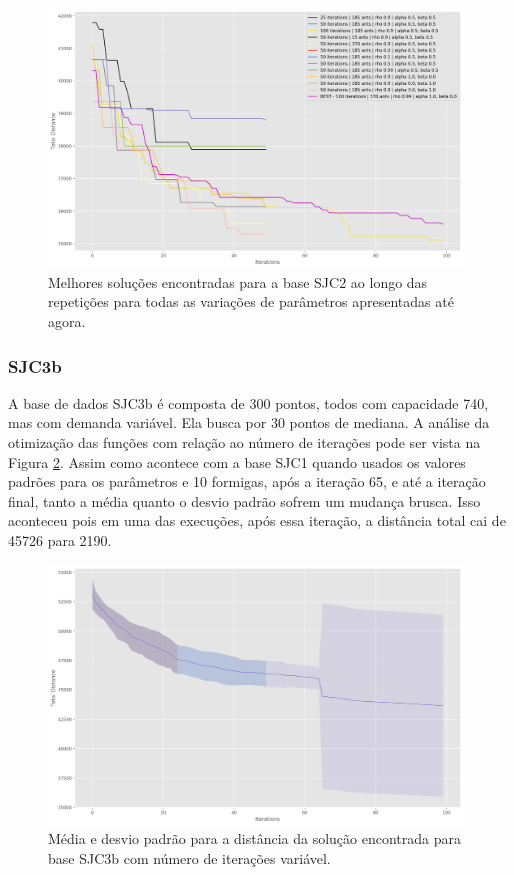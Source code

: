 \begin{figure}[h]	
  \centering
  \includegraphics[width=11cm,keepaspectratio]{images/SJC2_best.png}
  \caption{Melhores soluções encontradas para a base SJC2 ao longo das repetições para todas as variações de parâmetros apresentadas até agora.}
  \label{fig:sjc2_best}
\end{figure}

\subsubsection{SJC3b}
A base de dados SJC3b é composta de 300 pontos, todos com capacidade 740, mas com demanda variável. Ela busca por 30 pontos de mediana. A análise da otimização das funções com relação ao número de iterações pode ser vista na Figura \ref{fig:sjc3b_iterations}. Assim como acontece com a base SJC1 quando usados os valores padrões para os parâmetros e 10 formigas, após a iteração 65, e até a iteração final, tanto a média quanto o desvio padrão sofrem um mudança brusca. Isso aconteceu pois em uma das execuções, após essa iteração, a distância total cai de 45726 para 2190. 

\begin{figure}[h]	
  \centering
  \includegraphics[width=11cm,keepaspectratio]{images/SJC3b_iterations.png}
  \caption{Média e desvio padrão para a distância da solução encontrada para base SJC3b com número de iterações variável.}
  \label{fig:sjc3b_iterations}
\end{figure}

